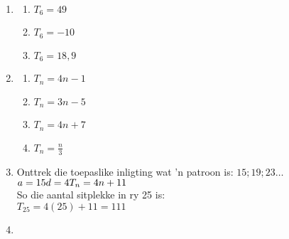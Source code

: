  \begin{eocsolutions}{}{
\begin{enumerate}[itemsep=5pt, label=\textbf{\arabic*}. ] 
 \item \begin{multicols}{2}



  \begin{enumerate}[noitemsep, label=\textbf{(\alph*)} ]
  \item $T_6 = 49$
  \item $T_6 = -10$
  \item $T_6 = 18,9$
  \end{enumerate}
\end{multicols}
\item \begin{multicols}{2}
  \begin{enumerate}[noitemsep, label=\textbf{(\alph*)} ]
\item 
$T_n = 4n - 1$ 
  \item 
$T_n = 3n -5$ 
  \item 
$T_n = 4n + 7 $ 
  \item 
$T_n = \frac{n}{3} $ 
  \end{enumerate}
\end{multicols}
\item Onttrek die toepaslike inligting wat 'n patroon is: $15; 19 ; 23 \ldots$\\
$a = 15\\
d = 4\\
T_n = 4n + 11 $ \\
So die aantal sitplekke in ry 25 is:\\
$T_{25} = 4(25) + 11 = 111$ 
\item 
  \begin{enumerate}[noitemsep, label=\textbf{(\alph*)} ]

\end{enumerate}
\end{enumerate}}
\end{eocsolutions}
